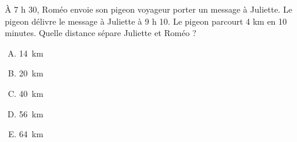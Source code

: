 \`A 7 h 30, Roméo envoie son pigeon voyageur porter un message à
Juliette. Le pigeon délivre le message à Juliette à 9 h 10. Le pigeon
parcourt 4 km en 10 minutes. Quelle distance sépare Juliette et Roméo
?
\begin{multicols}{5}
  \begin{enumerate}[A)]
  \item 14~km
  \item 20~km
  \item 40~km
  \item 56~km
  \item 64~km
  \end{enumerate}
\end{multicols}